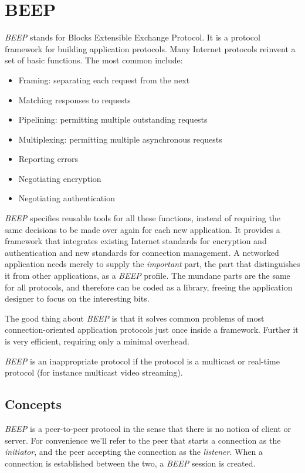 \section{BEEP}
\label{sect:beep}

\emph{BEEP} stands for Blocks Extensible Exchange Protocol. It is a protocol framework for building application protocols. Many Internet protocols reinvent a set of basic functions. The most common include:

\begin{itemize}
 \item Framing: separating each request from the next
 \item Matching responses to requests
 \item Pipelining: permitting multiple outstanding requests
 \item Multiplexing: permitting multiple asynchronous requests
 \item Reporting errors
 \item Negotiating encryption
 \item Negotiating authentication
\end{itemize}

\emph{BEEP} specifies reusable tools for all these functions, instead of requiring the same decisions to be made over again for each new application. It provides a framework that integrates existing Internet standards for encryption and authentication and new standards for connection management. A networked application needs merely to supply the \emph{important} part, the part that distinguishes it from other applications, as a \emph{BEEP} profile. The mundane parts are the same for all protocols, and therefore can be coded as a library, freeing the application designer to focus on the interesting bits.

The good thing about \emph{BEEP} is that it solves common problems of most connection-oriented application protocols just once inside a framework. Further it is very efficient, requiring only a minimal overhead.

\emph{BEEP} is an inappropriate protocol if the protocol is a multicast or real-time protocol (for instance multicast video streaming).



\subsection{Concepts}
\emph{BEEP} is a peer-to-peer protocol in the sense that there is no notion of client or server. For convenience we'll refer to the peer that starts a connection as the \emph{initiator}, and the peer accepting the connection as the \emph{listener}. When a connection is established between the two, a \emph{BEEP} session is created.

